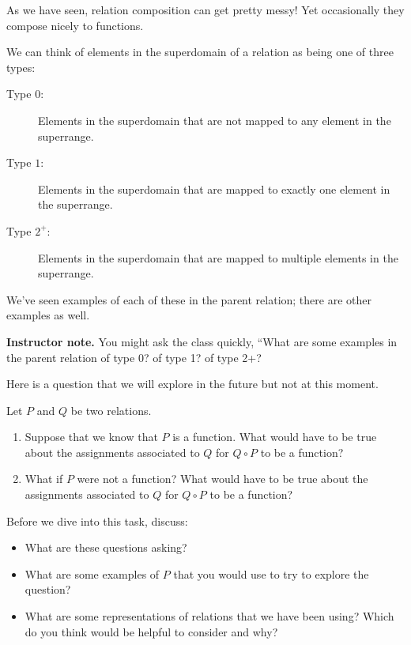 \documentclass[11pt]{article}
\newcommand\smallnote[1]
	{\begin{mdframed}\raggedright  {\bf Instructor note.} {#1} \end{mdframed}}
\newenvironment{task}
	{\begin{mdframed}[linecolor=lightgray, linewidth=3pt]\raggedright}
	{\end{mdframed}}
\theoremstyle{definition}
\begin{document}
As we have seen, relation composition can get pretty messy! Yet occasionally they compose nicely to functions. 

We can think of elements in the superdomain of a relation as being one of three types:
	\begin{description}
	\item [Type $0$:] Elements in the superdomain that are not mapped to any element in the superrange.
	\item [Type $1$:] Elements in the superdomain that are mapped to exactly one element in the superrange.
	\item [Type $2^+$:] Elements in the superdomain that are mapped to multiple elements in the superrange.
	\end{description}

We've seen examples of each of these in the parent relation; there are other examples as well.

\smallnote{You might ask the class quickly, ``What are some examples in the parent relation of type 0? of type 1? of type 2+?}

\begin{task}
Here is a question that we will explore in the future but not at this moment. 

\begin{task} Let $P$ and $Q$ be two relations. 
	\begin{enumerate}[label=(\alph*)]
	\item Suppose that we know that $P$ is a function. What would have to be true about the assignments associated to $Q$ for $Q\circ P$ to be a function?
	\item What if $P$ were not a function? What would have to be true about the assignments associated to $Q$ for $Q\circ P$ to be a function?
	\end{enumerate}
\end{task}

Before we dive into this task, discuss: 
	\begin{itemize}
	\item What are these questions asking?
	\item What are some examples of $P$ that you would use to try to explore the question?
	\item What are some representations of relations that we have been using? Which do you think would be helpful to consider and why?
	\end{itemize}

\end{task}
\end{document}
